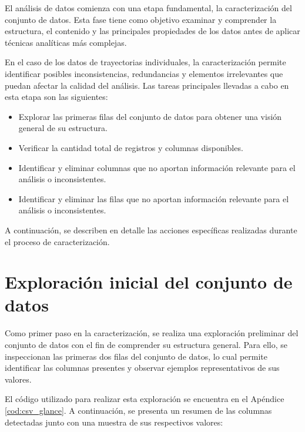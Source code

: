 \label{sec:caracterizacion}
El análisis de datos comienza con una etapa fundamental, la caracterización del conjunto de datos. Esta fase tiene como objetivo examinar y comprender la estructura, el contenido y las principales propiedades de los datos antes de aplicar técnicas analíticas más complejas. 

En el caso de los datos de trayectorias individuales, la caracterización permite identificar posibles inconsistencias, redundancias y elementos irrelevantes que puedan afectar la calidad del análisis. Las tareas principales llevadas a cabo en esta etapa son las siguientes:
\begin{itemize}
    \item Explorar las primeras filas del conjunto de datos para obtener una visión general de su estructura.
    \item Verificar la cantidad total de registros y columnas disponibles.
    \item Identificar y eliminar columnas que no aportan información relevante para el análisis o inconsistentes.
    \item Identificar y eliminar las filas que no aportan información relevante para el análisis o inconsistentes.
\end{itemize}
A continuación, se describen en detalle las acciones específicas realizadas durante el proceso de caracterización.
\vfill

\section{Exploración inicial del conjunto de datos}
\label{sec:exploracion_inicial}
Como primer paso en la caracterización, se realiza una exploración preliminar del conjunto de datos con el fin de comprender su estructura general. Para ello, se inspeccionan las primeras dos filas del conjunto de datos, lo cual permite identificar las columnas presentes y observar ejemplos representativos de sus valores.

El código utilizado para realizar esta exploración se encuentra en el Apéndice \ref{cod:csv_glance}. A continuación, se presenta un resumen de las columnas detectadas junto con una muestra de sus respectivos valores:

